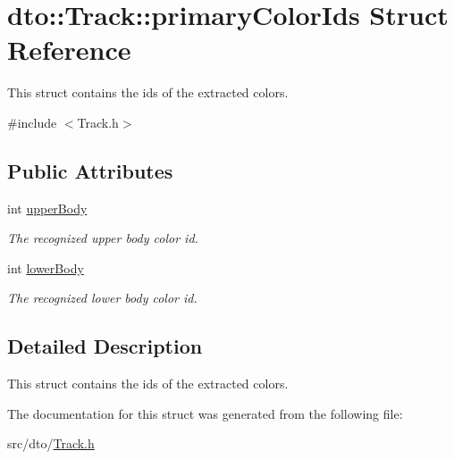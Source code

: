 \hypertarget{structdto_1_1_track_1_1primary_color_ids}{}\section{dto\+:\+:Track\+:\+:primary\+Color\+Ids Struct Reference}
\label{structdto_1_1_track_1_1primary_color_ids}


This struct contains the ids of the extracted colors.  




{\ttfamily \#include $<$Track.\+h$>$}

\subsection*{Public Attributes}
\begin{DoxyCompactItemize}
\item 
\mbox{\label{structdto_1_1_track_1_1primary_color_ids_a8bab82c7c4a1d0903580465db31e8bc3}} 
int \mbox{\hyperlink{structdto_1_1_track_1_1primary_color_ids_a8bab82c7c4a1d0903580465db31e8bc3}{upper\+Body}}
\begin{DoxyCompactList}\small\item\em The recognized upper body color id. \end{DoxyCompactList}\item 
\mbox{\label{structdto_1_1_track_1_1primary_color_ids_a10ddda334562f2bb9d36ba59932d7df8}} 
int \mbox{\hyperlink{structdto_1_1_track_1_1primary_color_ids_a10ddda334562f2bb9d36ba59932d7df8}{lower\+Body}}
\begin{DoxyCompactList}\small\item\em The recognized lower body color id. \end{DoxyCompactList}\end{DoxyCompactItemize}


\subsection{Detailed Description}
This struct contains the ids of the extracted colors. 

The documentation for this struct was generated from the following file\+:\begin{DoxyCompactItemize}
\item 
src/dto/\mbox{\hyperlink{_track_8h}{Track.\+h}}\end{DoxyCompactItemize}
